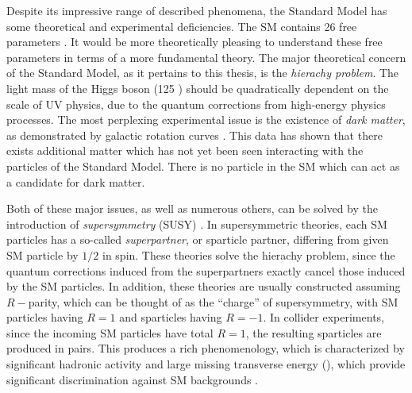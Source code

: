 Despite its impressive range of described phenomena, the Standard Model has some theoretical and experimental deficiencies.
The SM contains 26 free parameters \footnotemark.
It would be more theoretically pleasing to understand these free parameters in terms of a more fundamental theory.
The major theoretical concern of the Standard Model, as it pertains to this thesis, is the \textit{hierachy problem}\cite {Weinberg:1975gm,Weinberg:1979bn, Gildener:1976ai, Susskind:1978ms, susyPrimer}.
The light mass of the Higgs boson (125 \GeV) should be quadratically dependent on the scale of UV physics, due to the quantum corrections from high-energy physics processes.
The most perplexing experimental issue is the existence of \textit{dark matter}, as demonstrated by galactic rotation curves \cite{Rubin:1970zza, Roberts:1970zza, Rubin:1980zd, Rubin:1985ze, Bosma:1981zz, Persic:1995ru, darkMatterPrimer}.
This data has shown that there exists additional matter which has not yet been seen interacting with the particles of the Standard Model.
There is no particle in the SM which can act as a candidate for dark matter.

Both of these major issues, as well as numerous others, can be solved by the introduction of \textit{supersymmetry} (SUSY) \cite{Miyazawa:1966mfa, Gervais:1971xj, Gervais:1971ji, Golfand:1971iw, Neveu:1971rx, Neveu:1971iv, Volkov:1973ix,  Wess:1973kz, Salam:1974ig, Ferrara:1974ac, Wess:1974tw, susyPrimer,Lykken:1996xt,archilSUSYLectures}.
In supersymmetric theories, each SM particles has a so-called \textit{superpartner}, or sparticle partner, differing from given SM particle by $1/2$ in spin.
These theories solve the hierachy problem, since the quantum corrections induced from the superpartners exactly cancel those induced by the SM particles.
In addition, these theories are usually constructed assuming $R-$parity, which can be thought of as the ``charge'' of supersymmetry, with SM particles having $R=1$ and sparticles having $R=-1$.
In collider experiments, since the incoming SM particles have total $R=1$, the resulting sparticles are produced in pairs.
This produces a rich phenomenology, which is characterized by significant hadronic activity and large missing transverse energy (\met), which provide significant discrimination against SM backgrounds \cite{Farrar:1978xj}.

